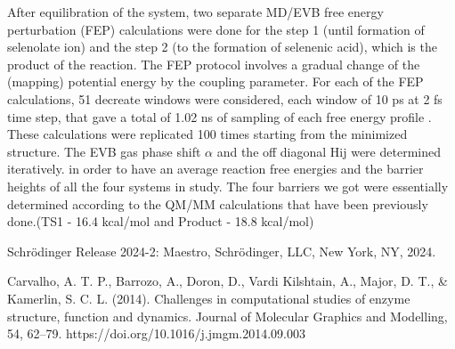 \documentclass{article}
\begin{document}
After equilibration of the system, two separate MD/EVB free energy perturbation (FEP) calculations were done for the step 1 (until formation of selenolate ion) and the step 2 (to the formation of selenenic acid), which is the product of the reaction. The FEP protocol involves a gradual change of the (mapping) potential energy by the coupling parameter. For each of the FEP calculations, 51 decreate windows were considered, each window of 10 ps at 2 fs time step, that gave a total of 1.02 ns of sampling of each free energy profile . These calculations were replicated 100 times starting from the minimized structure. The EVB gas phase shift $\alpha$  and the off diagonal Hij were determined iteratively. in order to have an average reaction free energies and the barrier heights of all the four systems in study. The four barriers we got were essentially determined according to the QM/MM calculations that have been previously done.(TS1 - 16.4 kcal/mol and Product - 18.8 kcal/mol)


\medskip




\begin{thebibliography}{9}

Schrödinger Release 2024-2: Maestro, Schrödinger, LLC, New York, NY, 2024.

Carvalho, A. T. P., Barrozo, A., Doron, D., Vardi Kilshtain, A., Major, D. T., & Kamerlin, S. C. L. (2014). Challenges in computational studies of enzyme structure, function and dynamics. Journal of Molecular Graphics and Modelling, 54, 62–79. https://doi.org/10.1016/j.jmgm.2014.09.003

\end{thebibliography}
\end{document}
